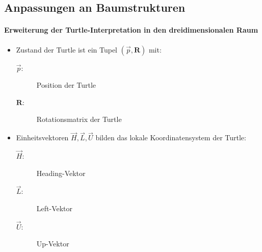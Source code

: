 \newpage
{}

\subsection{Anpassungen an Baumstrukturen \\}

\paragraph{Erweiterung der Turtle-Interpretation in den dreidimensionalen Raum}

\begin{itemize}
	\item Zustand der Turtle ist ein Tupel $(\overrightarrow{p}, \boldsymbol{R})$ mit:
	\begin{description}
		\item[\boldmath$\overrightarrow{p}:$] Position der Turtle
		
		\item[\boldmath$\boldsymbol{R}:$] Rotationsmatrix der Turtle\\
	\end{description}
	
	\item Einheitsvektoren $\overrightarrow{H}, \overrightarrow{L}, \overrightarrow{U}$ bilden das lokale Koordinatensystem der Turtle:
	\begin{description}
		\item[\boldmath$\overrightarrow{H}:$] Heading-Vektor
		
		\item[\boldmath$\overrightarrow{L}:$] Left-Vektor
				
		\item[\boldmath$\overrightarrow{U}:$] Up-Vektor
	\end{description}
\end{itemize}





